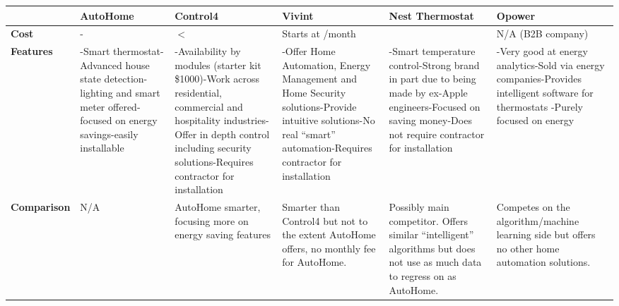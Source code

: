 \documentclass[10.5pt,a4paper,twoside]{report}   %
\begin{document}
\begin{center}
    \begin{tabular}{ | l | p{2.25cm} | p{3cm} | p{2.5cm} | p{2.5cm} | p{2.75cm} |}
    \hline
    & \bf AutoHome & \bf Control4 & \bf Vivint& \bf Nest Thermostat&\bf Opower\\ \hline
    \bf{Cost} & \textsterling 150-\textsterling 200 & $<$\textsterling 650 & Starts at \textsterling 38/month&\textsterling 161 & N/A (B2B company)  \\ \hline
    \bf{Features} & -Smart thermostat\newline -Advanced house state detection\newline-lighting and smart meter offered\newline-focused on energy savings\newline -easily installable & -Availability by modules (starter kit \$1000)\newline -Work across residential, commercial and hospitality industries\newline -Offer in depth control including security solutions\newline -Requires contractor for installation & -Offer Home Automation, Energy Management and Home Security solutions\newline -Provide intuitive solutions\newline -No real “smart” automation\newline-Requires contractor for installation &-Smart temperature control\newline -Strong brand in part due to being made by ex-Apple engineers\newline -Focused on saving money\newline -Does not require contractor for installation & -Very good at energy analytics\newline -Sold via energy companies\newline -Provides intelligent software for thermostats \newline -Purely focused on energy  \\ \hline
      \bf{Comparison} & N/A & AutoHome smarter, focusing more on energy saving features &  Smarter than Control4 but not to the extent AutoHome offers, no monthly fee for AutoHome. &  Possibly main competitor. Offers similar “intelligent” algorithms but does not use as much data to regress on as AutoHome.& Competes on the algorithm/machine learning side but offers no other home automation solutions.\\ \hline
    \end{tabular}
\end{center}
\end{document}
